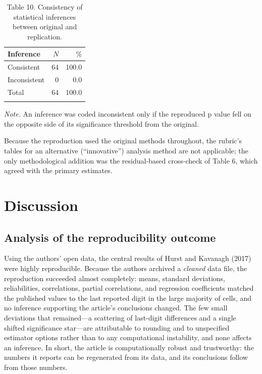 \documentclass[
  english,
  man,floatsintext]{apa6}
\begin{document}
\begin{table}[tbp]

\begin{center}
\begin{threeparttable}

\caption{\label{tab:tab-infer}Table 10. Consistency of statistical inferences between original and replication.}

\begin{tabular}{lrr}
\toprule
Inference & $N$ & $\%$\\
\midrule
Consistent & 64 & 100.0\\
Inconsistent & 0 & 0.0\\
Total & 64 & 100.0\\
\bottomrule
\addlinespace
\end{tabular}

\begin{tablenotes}[para]
\normalsize{\textit{Note.} An inference was coded inconsistent only if the reproduced p value fell on the opposite side of its significance threshold from the original.}
\end{tablenotes}

\end{threeparttable}
\end{center}

\end{table}

Because the reproduction used the original methods throughout, the rubric's tables for an alternative (``innovative'') analysis method are not applicable; the only methodological addition was the residual-based cross-check of Table 6, which agreed with the primary estimates.

\section{Discussion}\label{discussion}

\subsection{Analysis of the reproducibility outcome}\label{analysis-of-the-reproducibility-outcome}

Using the authors' open data, the central results of Hurst and Kavanagh (2017) were highly reproducible. Because the authors archived a \emph{cleaned} data file, the reproduction succeeded almost completely: means, standard deviations, reliabilities, correlations, partial correlations, and regression coefficients matched the published values to the last reported digit in the large majority of cells, and no inference supporting the article's conclusions changed. The few small deviations that remained---a scattering of last-digit differences and a single shifted significance star---are attributable to rounding and to unspecified estimator options rather than to any computational instability, and none affects an inference. In short, the article is computationally robust and trustworthy: the numbers it reports can be regenerated from its data, and its conclusions follow from those numbers.
\end{document}
